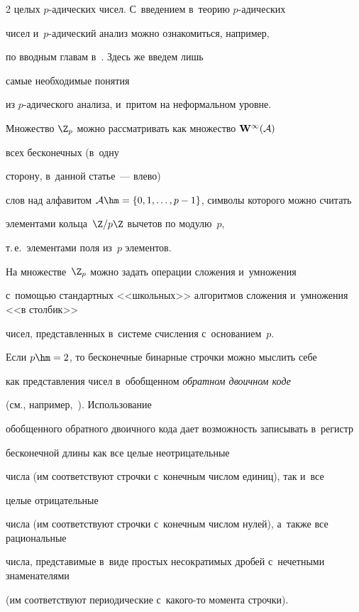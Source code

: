 \begin{multicols}{2}
{целых $p$-ади\-че\-ских чисел}. С~введением в~теорию $p$-ади\-че\-ских


чисел и~$p$-ади\-че\-ский анализ можно ознакомиться, например,


по вводным главам в~\cite{AnKhr}. Здесь же введем  лишь


самые необходимые понятия


из $p$-ади\-че\-ско\-го анализа, и~притом на неформальном уровне.





Множество $\Z_p$ можно рассматривать как множество $\mathbf W^\infty (\mathcal A)$ 


всех бесконечных (в~одну


сторону, в~данной статье~--- влево)


слов над алфавитом $\Cal A\hm=\{0,1,\ldots,p-1\}$, символы которого можно считать


элементами кольца~$\Z/p\Z$ вычетов по модулю~$p$, 


т.\,е.\ элементами поля из~$p$ элементов. 


На множестве~$\Z_p$ можно задать операции сложения и~умножения


с~по\-мощью стандартных <<школьных>> алгоритмов сложения и~умножения <<в столбик>>


чисел, пред\-став\-лен\-ных в~сис\-те\-ме счис\-ле\-ния с~основанием~$p$.


Если $p\hm=2$, то бесконечные бинарные строч\-ки можно мыслить себе


как представления чисел в~обобщенном \textit{обратном двоичном коде}


(см., например,~\cite[с.~213]{Knuth}).  Использование


обобщенного обратного двоичного кода дает возможность записывать в~регистр 


бесконечной длины как все целые неотрицательные


чис\-ла (им соответствуют строчки с~конечным числом единиц), так и~все 


целые отрицательные


чис\-ла (им соответствуют строчки с~конечным числом нулей), а~также все рациональные


чис\-ла, пред\-ста\-ви\-мые в~виде простых несократимых дробей с~нечетными знаменателями


(им соответствуют периодические с~ка\-ко\-го-то момента строчки).






\end{multicols}
